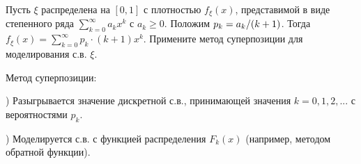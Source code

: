 \begin{comment}
\begin{problem}

Если $X$ -- с.в., имеющая стандартное нормальное распределение, то $X^{-2} $ имеет устойчивую плотность:
\[\frac{1}{\sqrt{2\pi } } e^{-\frac{1}{2x} } x^{-\frac{3}{2} } , x>0.\] 
Используя это, покажите, что если $X$ и $Y$ -- независимые нормально распределенные с.в. с нулевым математическим ожиданием и дисперсиями $\sigma _{1}^{2} $ и $\sigma _{2}^{2} $, то величина $Z=\frac{XY}{\sqrt{X^{2} +Y^{2} } } $ нормально распределена с дисперсией $\sigma _{3}^{2} $, такой, что $\frac{1}{\sigma _{3}^{2} } =\frac{1}{\sigma _{1}^{2} } +\frac{1}{\sigma _{2}^{2} } $ (Л.Шепп).

\end{problem}
\end{comment}



\begin{problem}

Пусть $\xi $ распределена на $\left[0,1\right]$ с плотностью $f_{\xi } (x)$, представимой в виде степенного ряда $\sum _{k=0}^{\infty }a_{k} x^{k}  $ с $a_{k} \ge 0$. Положим $p_{k} ={a_{k} \mathord{\left/ {\vphantom {a_{k}  (k+1)}} \right. \kern-\nulldelimiterspace} (k+1)} $. Тогда $f_{\xi } (x)=\sum _{k=0}^{\infty }p_{k} \cdot (k+1)x^{k}  $. Примените метод суперпозиции для моделирования с.в. $\xi $.

\begin{ordre}
Метод суперпозиции:

) Разыгрывается значение дискретной с.в., принимающей значения $k=0,1,2,...$ с вероятностями $p_{k} $.

) Моделируется с.в. с функцией распределения $F_{k} (x)$ (например, методом обратной функции).

\end{ordre}

\end{problem}

\begin{comment}
\begin{problem}[Теорема Бернштейна] 

\textbf{а)} С помощью неравенства Чебышёва установите следующий результат из анализа: 

\[
\forall \; \; f\in C\left[0,1\right]\to \left\| f_{n} -f\right\| _{C\left[0,1\right]} \xrightarrow[{n\to \infty }]{} 0,
\] 

\[
f_{n} \left(x\right)=\sum_{k=0}^{n}f\left(\frac{k}{n} \right) C_{n}^{k} x^{k} \left(1-x\right)^{n-k} 
\]

\textbf{б)} Исходя из предыдущей задачи и п. а) предложите способ генерирования распределения с.в. $\xi $, имеющей плотность $f_{\xi } \left(x\right)$ с финитным носителем, для определенности, пусть носителем будет отрезок $\left[0,1\right]$.
\end{problem}
\end{comment}

